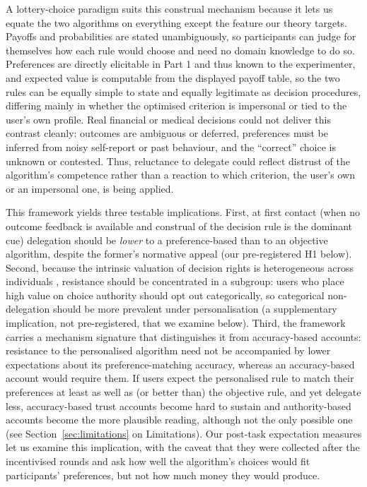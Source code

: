 \documentclass[a4paper, 12pt, fleqn]{article}
\theoremstyle{hypstyle}
\begin{document}
A lottery-choice paradigm suits this construal mechanism because it lets us equate the two algorithms on everything except the feature our theory targets. Payoffs and probabilities are stated unambiguously, so participants can judge for themselves how each rule would choose and need no domain knowledge to do so. Preferences are directly elicitable in Part 1 and thus known to the experimenter, and expected value is computable from the displayed payoff table, so the two rules can be equally simple to state and equally legitimate as decision procedures, differing mainly in whether the optimised criterion is impersonal or tied to the user's own profile. Real financial or medical decisions could not deliver this contrast cleanly: outcomes are ambiguous or deferred, preferences must be inferred from noisy self-report or past behaviour, and the ``correct'' choice is unknown or contested. Thus, reluctance to delegate could reflect distrust of the algorithm's competence rather than a reaction to which criterion, the user's own or an impersonal one, is being applied.

This framework yields three testable implications. First, at first contact (when no outcome feedback is available and construal of the decision rule is the dominant cue) delegation should be \emph{lower} to a preference-based than to an objective algorithm, despite the former's normative appeal (our pre-registered H1 below). Second, because the intrinsic valuation of decision rights is heterogeneous across individuals \citep{Bartling2014,Owens2014}, resistance should be concentrated in a subgroup: users who place high value on choice authority should opt out categorically, so categorical non-delegation should be more prevalent under personalisation (a supplementary implication, not pre-registered, that we examine below). Third, the framework carries a mechanism signature that distinguishes it from accuracy-based accounts: resistance to the personalised algorithm need not be accompanied by lower expectations about its preference-matching accuracy, whereas an accuracy-based account would require them. If users expect the personalised rule to match their preferences at least as well as (or better than) the objective rule, and yet delegate less, accuracy-based trust accounts become hard to sustain and authority-based accounts become the more plausible reading, although not the only possible one (see Section~\ref{sec:limitations} on Limitations). Our post-task expectation measures let us examine this implication, with the caveat that they were collected after the incentivised rounds and ask how well the algorithm's choices would fit participants' preferences, but not how much money they would produce.
\end{document}

